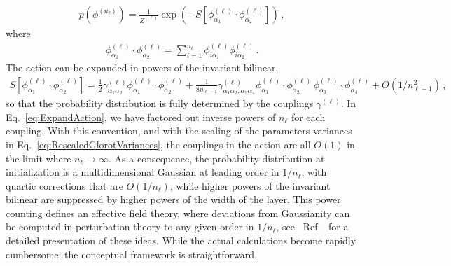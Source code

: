 \documentclass[11pt]{article}
\begin{document}
\begin{align}
    \label{eq:PriorAction}
    p\left(\phi^{(n_\ell)}\right) = 
        \frac{1}{Z^{(\ell)}} \exp\left(-S\left[\phi^{(\ell)}_{\alpha_1} 
            \cdot \phi^{(\ell)}_{\alpha_2}\right]\right)\, , 
\end{align}
where
\begin{align}
    \label{eq:PhiInvariant}
    \phi^{(\ell)}_{\alpha_1} 
            \cdot \phi^{(\ell)}_{\alpha_2} = 
    \sum_{i=1}^{n_\ell} \phi^{(\ell)}_{i \alpha_1} \phi^{(\ell)}_{i \alpha_2}\, .
\end{align}
The action can be expanded in powers of the invariant bilinear, 
\begin{align}
    \label{eq:ExpandAction}
    S\left[\phi^{(\ell)}_{\alpha_1} 
            \cdot \phi^{(\ell)}_{\alpha_2}\right] = 
        \frac12 \gamma^{(\ell)}_{\alpha_1\alpha_2} 
            \phi^{(\ell)}_{\alpha_1} \cdot \phi^{(\ell)}_{\alpha_2} + 
            \frac{1}{8 n_{\ell-1}} \gamma^{(\ell)}_{\alpha_1\alpha_2,\alpha_3\alpha_4}
            \phi^{(\ell)}_{\alpha_1} \cdot \phi^{(\ell)}_{\alpha_2} \,
            \phi^{(\ell)}_{\alpha_3} \cdot \phi^{(\ell)}_{\alpha_4} + O(1/n_{\ell-1}^2)\, ,
\end{align}
so that the probability distribution is fully determined by the couplings $\gamma^{(\ell)}$. In 
Eq.~\eqref{eq:ExpandAction}, we have factored out inverse powers of $n_\ell$ for each coupling. 
With this convention, and with the scaling of the parameters variances in 
Eq.~\eqref{eq:RescaledGlorotVariances}, the couplings in the action are all $O(1)$ 
in the limit where $n_\ell\to\infty$.
As a consequence, the probability distribution at initialization is a multidimensional Gaussian at 
leading order in $1/n_\ell$, with quartic corrections that are $O(1/n_\ell)$, while higher powers 
of the invariant bilinear are suppressed by higher powers of the width of the layer. This power counting
defines an effective field theory, where deviations from Gaussianity can be computed in perturbation
theory to any given order in $1/n_\ell$, see \eg\ Ref.~\cite{Roberts:2021fes} for a detailed 
presentation of these ideas. While the actual calculations become rapidly cumbersome, the 
conceptual framework is straightforward. 
\end{document}
